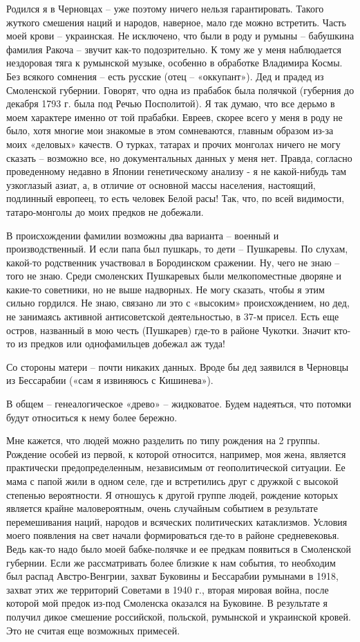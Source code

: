 \begin{itemize}
Родился я в Черновцах – уже поэтому ничего нельзя гарантировать. Такого жуткого
смешения наций и народов, наверное, мало где можно встретить. Часть моей крови
– украинская. Не исключено, что были в роду и румыны – бабушкина фамилия Ракоча
– звучит как-то подозрительно. К тому же у меня наблюдается нездоровая тяга к
румынской музыке, особенно в обработке Владимира Космы. Без всякого сомнения –
есть русские (отец – «оккупант»). Дед и прадед из Смоленской губернии. Говорят,
что одна из прабабок была полячкой (губерния до декабря 1793 г. была под Речью
Посполитой). Я так думаю, что все дерьмо в моем характере именно от той
прабабки. Евреев, скорее всего у меня в роду не было, хотя многие мои знакомые
в этом сомневаются, главным образом из-за моих «деловых» качеств. О турках,
татарах и прочих монголах ничего не могу сказать – возможно все, но
документальных данных у меня нет. Правда, согласно проведенному недавно в
Японии генетическому анализу - я не какой-нибудь там узкоглазый азиат, а, в
отличие от основной массы населения, настоящий, подлинный европеец, то есть
человек Белой расы! Так, что, по всей видимости, татаро-монголы до моих предков
не добежали.

В происхождении фамилии возможны два варианта – военный и производственный. И
если папа был пушкарь, то дети – Пушкаревы. По слухам, какой-то родственник
участвовал в Бородинском сражении. Ну, чего не знаю – того не знаю. Среди
смоленских Пушкаревых были мелкопоместные дворяне и какие-то советники, но не
выше надворных. Не могу сказать, чтобы я этим сильно гордился. Не знаю, связано
ли это с «высоким» происхождением, но дед, не занимаясь активной антисоветской
деятельностью, в 37-м присел. Есть еще остров, названный в мою честь (Пушкарев)
где-то в районе Чукотки. Значит кто-то из предков или однофамильцев добежал аж
туда!

Со стороны матери – почти никаких данных. Вроде бы дед заявился в Черновцы из
Бессарабии («сам я извиняюсь с Кишинева»).

В общем – генеалогическое «древо» – жидковатое. Будем надеяться, что потомки
будут относиться к нему более бережно.

Мне кажется, что людей можно разделить по типу рождения на 2 группы. Рождение
особей из первой, к которой относится, например, моя жена, является практически
предопределенным, независимым от геополитической ситуации. Ее мама с папой жили
в одном селе, где и встретились друг с дружкой с высокой степенью вероятности.
Я отношусь к другой группе людей, рождение которых является крайне
маловероятным, очень случайным событием в результате перемешивания наций,
народов и всяческих политических катаклизмов. Условия моего появления на свет
начали формироваться где-то в районе средневековья. Ведь как-то надо было моей
бабке-полячке и ее предкам появиться в Смоленской губернии. Если же
рассматривать более близкие к нам события, то необходим был распад
Австро-Венгрии, захват Буковины и Бессарабии румынами в 1918, захват этих же
территорий Советами в 1940 г., вторая мировая война, после которой мой предок
из-под Смоленска оказался на Буковине. В результате я получил дикое смешение
российской, польской, румынской и украинской кровей. Это не считая еще
возможных примесей.


\end{itemize}
